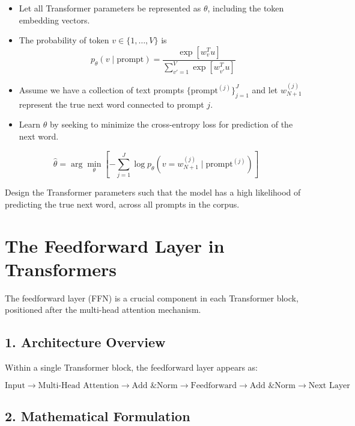 \documentclass[12pt]{extarticle}
\begin{document}
\begin{itemize}
    \item Let all Transformer parameters be represented as $\theta$, including the token embedding vectors.
    
    \item The probability of token $v \in \{1, \ldots, V\}$ is
    \[
    p_\theta(v \mid \text{prompt}) = \frac{\exp[w_v^T u]}{\sum_{v'=1}^{V} \exp[w_{v'}^T u]}
    \]
    
    \item Assume we have a collection of text prompts $\{\text{prompt}^{(j)}\}_{j=1}^{J}$ and let $w_{N+1}^{(j)}$ represent the true next word connected to prompt $j$.
    
    \item Learn $\theta$ by seeking to minimize the cross-entropy loss for prediction of the next word.
\end{itemize}

\[
\hat{\theta} = \arg\min_{\theta} \left[ -\sum_{j=1}^{J} \log p_{\theta}\left(v = w_{N+1}^{(j)} \;\big|\; \text{prompt}^{(j)}\right) \right]
\]

Design the Transformer parameters such that the model has a high likelihood of predicting the true next word, across all prompts in the corpus.


\section*{The Feedforward Layer in Transformers}

The feedforward layer (FFN) is a crucial component in each Transformer block, positioned after the multi-head attention mechanism.

\subsection*{1. Architecture Overview}

Within a single Transformer block, the feedforward layer appears as:

\[
\text{Input} \rightarrow \text{Multi-Head Attention} \rightarrow \text{Add \& Norm} \rightarrow \boxed{\text{Feedforward}} \rightarrow \text{Add \& Norm} \rightarrow \text{Next Layer}
\]

\subsection*{2. Mathematical Formulation}
\end{document}
